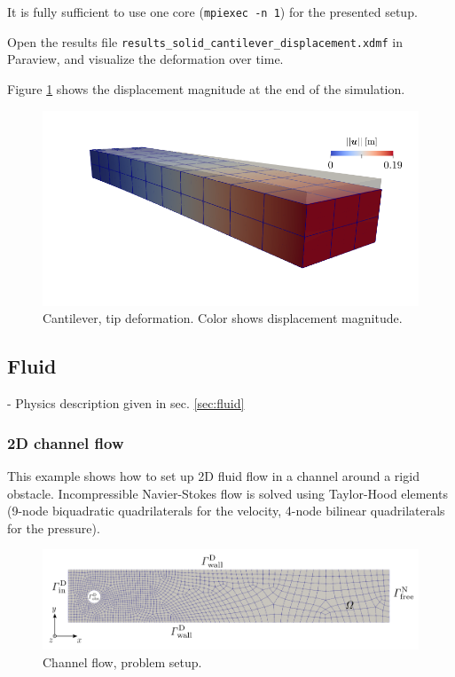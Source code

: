 \documentclass[a4paper,12pt]{report}
\begin{document}
It is fully sufficient to use one core (\verb#mpiexec -n 1#) for the presented setup.

Open the results file \verb"results_solid_cantilever_displacement.xdmf" in Paraview, and visualize the deformation over time.

Figure \ref{fig:cantilever_results} shows the displacement magnitude at the end of the simulation.

\begin{figure}
\centering
\includegraphics[width=0.7\columnwidth]{fig/cantilever_results}
\caption{Cantilever, tip deformation. Color shows displacement magnitude.}
\label{fig:cantilever_results}
\end{figure}


\subsection{Fluid}\label{subsec:demos:fluid}

- Physics description given in sec. \ref{sec:fluid}

\subsubsection*{2D channel flow}

This example shows how to set up 2D fluid flow in a channel around a rigid obstacle. Incompressible Navier-Stokes flow is solved using Taylor-Hood elements
(9-node biquadratic quadrilaterals for the velocity, 4-node bilinear quadrilaterals for the pressure).

\begin{figure}
\centering
\includegraphics[width=1.0\columnwidth]{fig/channel_setup}
\caption{Channel flow, problem setup.}
\label{fig:channel_setup}
\end{figure}
\end{document}
